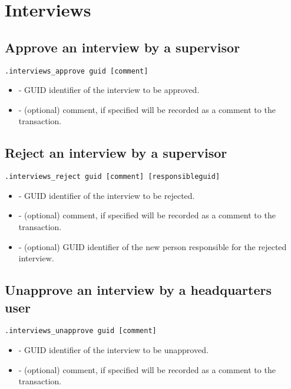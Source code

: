 \section{Interviews}

\subsection{Approve an interview by a supervisor}
\begin{lstlisting}[style=CommandLineStyle]
.interviews_approve guid [comment]
\end{lstlisting}
\paramsheader
\begin{itemize}
\item {} - GUID identifier of the interview to be approved.
\item {} - (optional) comment, if specified will be recorded as a comment to the transaction.
\end{itemize}

\subsection{Reject an interview by a supervisor}
\begin{lstlisting}[style=CommandLineStyle]
.interviews_reject guid [comment] [responsibleguid]
\end{lstlisting}
\paramsheader
\begin{itemize}
    \item {} - GUID identifier of the interview to be rejected.
    \item {} - (optional) comment, if specified will be recorded
          as a comment to the transaction.
    \item {} - (optional) GUID identifier of the new
          person responsible for the rejected interview.
\end{itemize}

\subsection{Unapprove an interview by a headquarters user}
\begin{lstlisting}[style=CommandLineStyle]
.interviews_unapprove guid [comment]
\end{lstlisting}
\paramsheader
\begin{itemize}
    \item {} - GUID identifier of the interview to be unapproved.
    \item {} - (optional) comment, if specified will be recorded
          as a comment to the transaction.
\end{itemize}

